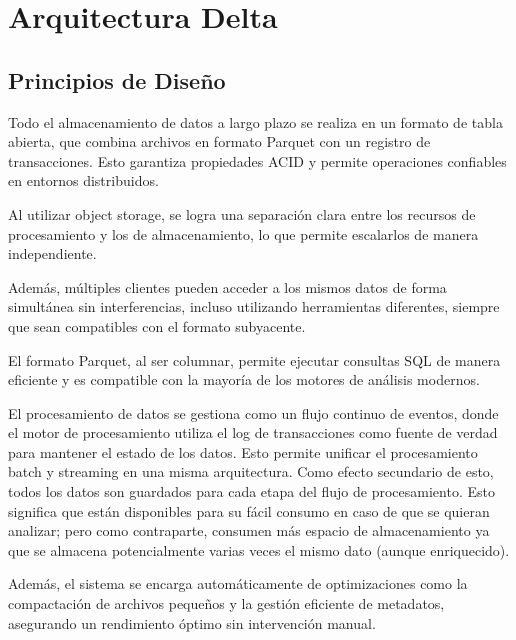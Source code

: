 \section{Arquitectura Delta}

\subsection{Principios de Diseño}

Todo el almacenamiento de datos a largo plazo se realiza en un formato de tabla abierta, 
que combina archivos en formato Parquet con un registro de transacciones. 
Esto garantiza propiedades ACID y permite operaciones confiables en entornos distribuidos. \newline

Al utilizar object storage, se logra una separación clara entre los recursos de procesamiento y los de almacenamiento, 
lo que permite escalarlos de manera independiente. \newline

Además, múltiples clientes pueden acceder a los mismos datos de forma simultánea sin interferencias, 
incluso utilizando herramientas diferentes, siempre que sean compatibles con el formato subyacente.\newline

El formato Parquet, al ser columnar, permite ejecutar consultas SQL de manera eficiente 
y es compatible con la mayoría de los motores de análisis modernos. \newline

El procesamiento de datos se gestiona como un flujo continuo de eventos, 
donde el motor de procesamiento utiliza el log de transacciones como fuente de verdad para mantener el estado de los datos. 
Esto permite unificar el procesamiento batch y streaming en una misma arquitectura.
Como efecto secundario de esto, todos los datos son guardados para cada etapa del flujo de procesamiento. 
Esto significa que están disponibles para su fácil consumo en caso de que se quieran analizar; 
pero como contraparte, consumen más espacio de almacenamiento ya que se almacena potencialmente varias veces el mismo dato (aunque enriquecido). \newline

Además, el sistema se encarga automáticamente de optimizaciones como la compactación de archivos pequeños
y la gestión eficiente de metadatos, asegurando un rendimiento óptimo sin intervención manual.\newline

